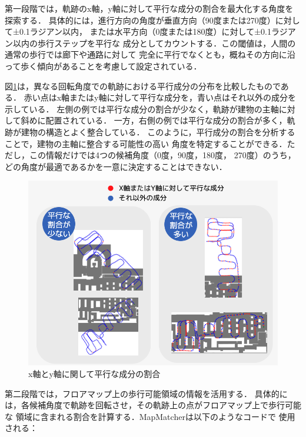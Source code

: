 第一段階では，軌跡のx軸，y軸に対して平行な成分の割合を最大化する角度を探索する．
具体的には，進行方向の角度が垂直方向（90度または270度）に対して±0.1ラジアン以内，
または水平方向（0度または180度）に対して±0.1ラジアン以内の歩行ステップを平行な
成分としてカウントする．この閾値は，人間の通常の歩行では廊下や通路に対して
完全に平行でなくとも，概ねその方向に沿って歩く傾向があることを考慮して設定されている．

図\ref{fig:parallel}は，異なる回転角度での軌跡における平行成分の分布を比較したものである．
赤い点はx軸またはy軸に対して平行な成分を，青い点はそれ以外の成分を示している．
左側の例では平行な成分の割合が少なく，軌跡が建物の主軸に対して斜めに配置されている．
一方，右側の例では平行な成分の割合が多く，軌跡が建物の構造とよく整合している．
このように，平行成分の割合を分析することで，建物の主軸に整合する可能性の高い
角度を特定することができる．ただし，この情報だけでは4つの候補角度（0度，90度，180度，
270度）のうち，どの角度が最適であるかを一意に決定することはできない．

\begin{figure}[H]
	\centering
	\includegraphics[width=\linewidth]{image/parallel.jpg}
	\caption{x軸とy軸に関して平行な成分の割合}    \label{fig:parallel}
\end{figure}

第二段階では，フロアマップ上の歩行可能領域の情報を活用する．
具体的には，各候補角度で軌跡を回転させ，その軌跡上の点がフロアマップ上で歩行可能な
領域に含まれる割合を計算する．MapMatcherは以下のようなコードで
使用される：


